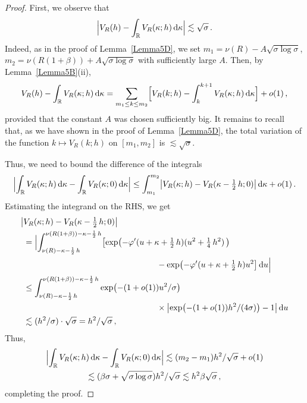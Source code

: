 \documentclass[10pt,a4paper]{amsart}
\newcommand{\bR}{\mathbb R}
\begin{document}
\begin{proof}
First, we observe that
\[
\Bigl| V_R(h) - \int_{\bR} V_R(\kappa; h)\, {\rm d}\kappa \Bigr|
\lesssim \sqrt{\sigma}\,.
\]
Indeed, as in the proof of Lemma~\ref{Lemma5D}, we set
$m_1 = \nu(R) - A\sqrt{\sigma\log\sigma}$, $m_2 = \nu(R(1+\beta)) +A\sqrt{\sigma\log\sigma}$
with sufficiently large $A$. Then, by Lemma~\ref{Lemma5B}(ii),
\[
V_R(h) - \int_{\bR} V_R(\kappa; h)\, {\rm d}\kappa
= \sum_{m_1 \le k \le m_2} \Bigl[ V_R(k; h) -
\int_k^{k+1} V_R(\kappa; h)\, {\rm d}\kappa \Bigr] + o(1)\,,
\]
provided that the constant $A$ was chosen sufficiently big. It remains to recall that,
as we have shown in the proof of Lemma~\ref{Lemma5D}, the total variation of the function
$k\mapsto V_R(k; h)$ on $[m_1, m_2]$ is $\lesssim\sqrt{\sigma}$.

Thus, we need to bound the difference of the integrals
\[
\Bigl| \int_{\bR} V_R(\kappa; h)\, {\rm d}\kappa -
\int_{\bR} V_R(\kappa; 0)\, {\rm d}\kappa\Bigr|
\le \int_{m_1}^{m_2} \bigl| V_R(\kappa; h) - V_R(\kappa-\tfrac12\, h; 0) \bigr|\, {\rm d}\kappa
+ o(1)\,.
\]
Estimating the integrand on the RHS, we get
\begin{align*}
\bigl|&V_R(\kappa; h) - V_R(\kappa-\tfrac12\, h; 0) \bigr| \\
&=
\Bigl|
\int_{\nu(R)-\kappa-\frac12\, h}^{\nu (R(1+\beta))-\kappa-\frac12\, h}
\bigl[ \exp\bigl( -\varphi'(u+\kappa+\tfrac12\, h)(u^2 + \tfrac14\, h^2)\,\bigr)\\
&\qquad\qquad\qquad\qquad\qquad\qquad\qquad\qquad -\exp\bigl( -\varphi'(u+\kappa+\tfrac12\, h)u^2 \bigr]\, {\rm d}u
\Bigr| \\
&\le \int_{\nu(R)-\kappa-\frac12\, h}^{\nu (R(1+\beta))-\kappa-\frac12\, h}
\exp\bigl( - (1+o(1))u^2/\sigma \bigr)\\
&\qquad\qquad\qquad\qquad\qquad\qquad\qquad\qquad\times\bigl| \exp\bigl( -(1+o(1))h^2/(4\sigma) \bigr) - 1\bigr|\, {\rm d}u
\\
&\lesssim (h^2/\sigma) \cdot \sqrt{\sigma} = h^2/\sqrt{\sigma}\,,
\end{align*}
Thus,
\begin{multline*}
\Bigl| \int_{\bR} V_R(\kappa; h)\, {\rm d}\kappa -
\int_{\bR} V_R(\kappa; 0)\, {\rm d}\kappa\Bigr|
\lesssim (m_2-m_1)h^2/\sqrt{\sigma} + o(1) \\
\lesssim (\beta\sigma + \sqrt{\sigma\log\sigma})h^2/\sqrt{\sigma}
\lesssim h^2\beta\sqrt{\sigma}\,,
\end{multline*}
completing the proof.
\end{proof}
\end{document}
